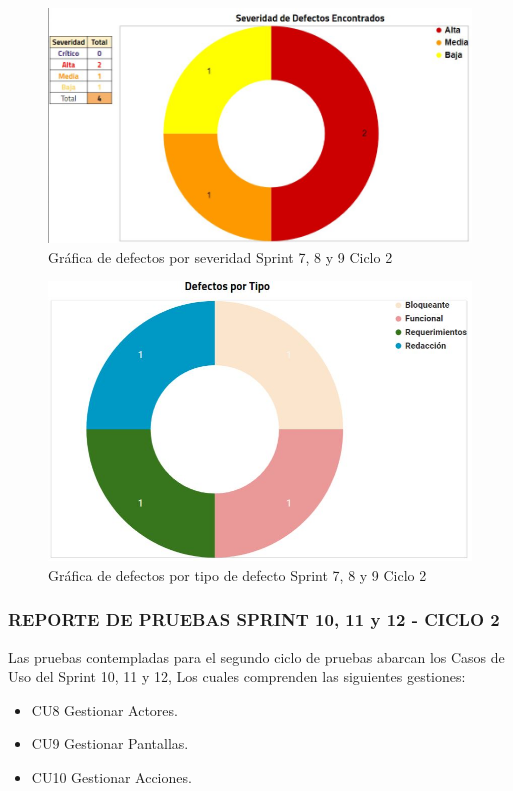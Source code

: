 \begin{figure}[H]
	\begin{center}
		\includegraphics[width=.85\textwidth]{images/pruebas/s7c2-1}
		\caption{Gráfica de defectos por severidad Sprint 7, 8 y 9  Ciclo 2}
		\label{fig:infos7c2-1}
	\end{center}
\end{figure}

\begin{figure}[H]
	\begin{center}
		\includegraphics[width=.75\textwidth]{images/pruebas/s7c2-2}
		\caption{Gráfica de defectos por tipo de defecto Sprint 7, 8 y 9  Ciclo 2}
		\label{fig:infos7c2-2}
	\end{center}
\end{figure}

\subsubsection{REPORTE DE PRUEBAS SPRINT 10, 11 y 12 - CICLO 2}

Las pruebas contempladas para el segundo ciclo de pruebas abarcan los Casos de Uso del Sprint 10, 11 y 12, Los cuales comprenden las siguientes gestiones:

\begin{itemize}
	\item CU8 Gestionar Actores.
	\item CU9 Gestionar Pantallas.
	\item CU10 Gestionar Acciones.
\end{itemize}

